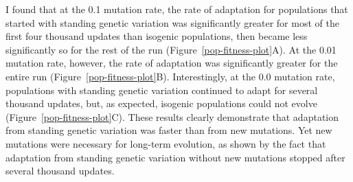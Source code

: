 \begin{doublespace}
I found that at the 0.1 mutation rate,
the rate of adaptation for populations
that started with standing genetic variation
was significantly greater for most of the first four thousand updates
than isogenic populations,
then became less significantly so for the rest of the run
(Figure~\ref{pop-fitness-plot}A).
%
At the 0.01 mutation rate, however,
the rate of adaptation was significantly greater for the entire run
(Figure~\ref{pop-fitness-plot}B).
%
Interestingly, at the 0.0 mutation rate,
populations with standing genetic variation
continued to adapt for several thousand updates,
but, as expected, isogenic populations could not evolve
(Figure~\ref{pop-fitness-plot}C).
%
These results clearly demonstrate that
adaptation from standing genetic variation
was faster than from new mutations.
%
Yet new mutations were necessary for long-term evolution,
as shown by the fact that adaptation
from standing genetic variation without new mutations
stopped after several thousand updates.




\end{doublespace}

